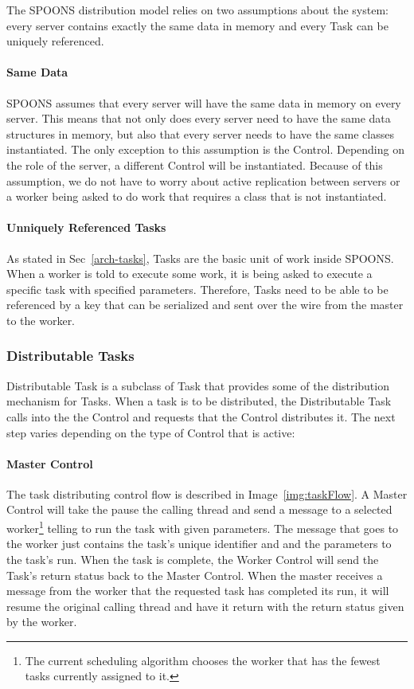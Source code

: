 \documentclass[12pt]{ucthesis}
\begin{document}
The SPOONS distribution model relies on two assumptions about the system: every server contains
exactly the same data in memory and every Task can be uniquely referenced.

\paragraph{Same Data}
SPOONS assumes that every server will have the same data in memory on every server.
This means that not only does every server need to have the same data structures in memory,
but also that every server needs to have the same classes instantiated. The only exception to this
assumption is the Control. Depending on the role of the server, a different Control will be
instantiated. Because of this assumption, we do not have to worry about active replication
between servers or a worker being asked to do work that requires a class that is not instantiated.

\paragraph{Unniquely Referenced Tasks}
As stated in Sec~\ref{arch-tasks}, Tasks are the basic unit of work inside SPOONS.
When a worker is told to execute some work, it is being asked to execute a specific task with specified
parameters. Therefore, Tasks need to be able to be referenced by a key that can be serialized and
sent over the wire from the master to the worker.

\subsubsection{Distributable Tasks}
\label{arch-dist-tasks}
Distributable Task is a subclass of Task that provides some of the distribution mechanism for Tasks.
When a task is to be distributed, the Distributable Task calls into the the Control and requests that
the Control distributes it. The next step varies depending on the type of Control that is active:

\paragraph{Master Control}
The task distributing control flow is described in Image~\ref{img:taskFlow}.
A Master Control will take the pause the calling thread and send a message to a selected worker\footnote{The
current scheduling algorithm chooses the worker that has the fewest tasks currently assigned to it.} telling to
run the task with given parameters. The message that goes to the worker just contains the task's unique identifier
and and the parameters to the task's run. When the task is complete, the Worker Control will send the Task's return
status back to the Master Control. When the master receives a message from the worker that the requested task
has completed its run, it will resume the original calling thread and have it return with the return status given
by the worker.
\end{document}
